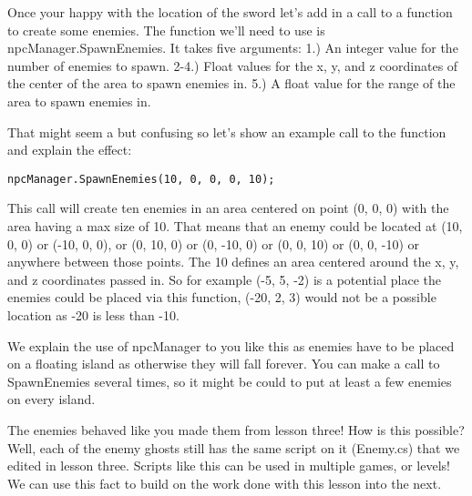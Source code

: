 \documentclass{article}
\begin{document}
\noindent{}

Once your happy with the location of the sword let's add in a call to a function to create some enemies. The function we'll need to use is npcManager.SpawnEnemies. It takes five arguments: 1.) An integer value for the number of enemies to spawn. 2-4.) Float values for the x, y, and z coordinates of the center of the area to spawn enemies in. 5.) A float value for the range of the area to spawn enemies in. 

That might seem a but confusing so let's show an example call to the function and explain the effect: 

\lstset{style=sharpc}
\begin{lstlisting}
npcManager.SpawnEnemies(10, 0, 0, 0, 10);
\end{lstlisting} 

This call will create ten enemies in an area centered on point (0, 0, 0) with the area having a max size of 10. That means that an enemy could be located at (10, 0, 0) or (-10, 0, 0), or (0, 10, 0) or (0, -10, 0) or (0, 0, 10) or (0, 0, -10) or anywhere between those points. The 10 defines an area centered around the x, y, and z coordinates passed in. So for example (-5, 5, -2) is a potential place the enemies could be placed via this function, (-20, 2, 3) would not be a possible location as -20 is less than -10. 

We explain the use of npcManager to you like this as enemies have to be placed on a floating island as otherwise they will fall forever. You can make a call to SpawnEnemies several times, so it might be could to put at least a few enemies on every island. 

\noindent{}

The enemies behaved like you made them from lesson three! How is this possible? Well, each of the enemy ghosts still has the same script on it (Enemy.cs) that we edited in lesson three. Scripts like this can be used in multiple games, or levels! We can use this fact to build on the work done with this lesson into the next. 
\end{document}
